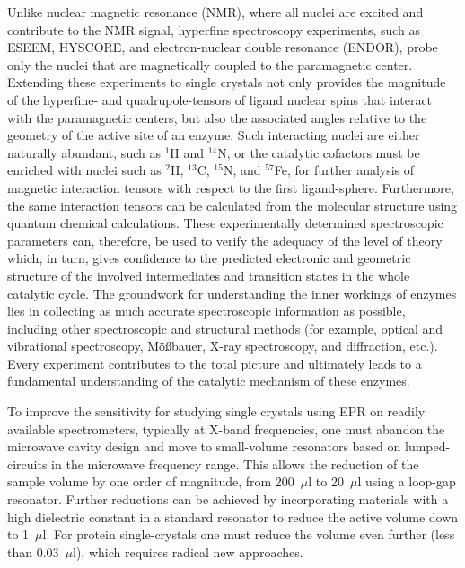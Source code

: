 Unlike nuclear magnetic resonance (NMR), where all nuclei are excited and contribute to the NMR signal, hyperfine spectroscopy experiments, such as ESEEM, HYSCORE, and electron-nuclear double resonance (ENDOR), probe only the nuclei that are magnetically coupled to the paramagnetic center. Extending these experiments to single crystals not only provides the magnitude of the hyperfine- and quadrupole-tensors of ligand nuclear spins that interact with the paramagnetic centers, but also the associated angles relative to the geometry of the active site of an enzyme. Such interacting nuclei are either naturally abundant, such as $^1$H and $^{14}$N, or the catalytic cofactors must be enriched with nuclei such as $^2$H, $^{13}$C, $^{15}$N, and $^{57}$Fe, for further analysis of magnetic interaction tensors with respect to the first ligand-sphere. Furthermore, the same interaction tensors can be calculated from the molecular structure using quantum chemical calculations. \cite{NEESE2003125} These experimentally determined spectroscopic parameters can, therefore, be used to verify the adequacy of the level of theory which, in turn, gives confidence to the predicted electronic and geometric structure of the involved intermediates and transition states in the whole catalytic cycle. The groundwork for understanding the inner workings of enzymes lies in collecting as much accurate spectroscopic information as possible, including other spectroscopic and structural methods (for example, optical and vibrational spectroscopy, M{\"o}{\ss}bauer, X-ray spectroscopy, and diffraction, etc.). Every experiment contributes to the total picture and ultimately leads to a fundamental understanding of the catalytic mechanism of these enzymes.

To improve the sensitivity for studying single crystals using EPR on readily available spectrometers, typically at X-band frequencies, one must abandon the microwave cavity design and move to small-volume resonators based on lumped-circuits in the microwave frequency range. This allows the reduction of the sample volume by one order of magnitude, from 200~$\mu$l to 20~$\mu$l using a loop-gap resonator. \cite{hydehoff} Further reductions can be achieved by incorporating materials with a high dielectric constant in a standard resonator to reduce the active volume down to 1~$\mu$l. \cite{dielectricReson1,dielectricReson2,METT2019106585} For protein single-crystals one must reduce the volume even further (less than 0.03~$\mu$l), which requires radical new approaches.

